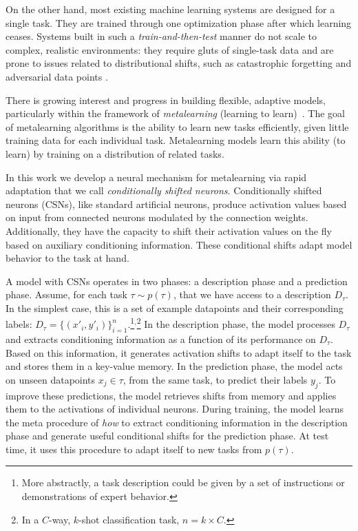 \documentclass{article}
\begin{document}
On the other hand, most existing machine learning systems are designed for a single task. They are trained through one optimization phase after which learning ceases. Systems built in such a \textit{train-and-then-test} manner do not scale to complex, realistic environments: they require gluts of single-task data and are prone to issues related to distributional shifts, such as catastrophic forgetting \cite{srivastava2013compete,goodfellow2013empirical,kirkpatrick2016overcoming} and adversarial data points \cite{szegedy2013intriguing}.

There is growing interest and progress in building flexible, adaptive models, particularly within the framework of \emph{metalearning} (learning to learn)~\citep{mitchell1993explanation,andrychowicz2016learning,vinyals2016matching,pmlr-v70-bachman17a}.
The goal of metalearning algorithms is the ability to learn new tasks efficiently, given little training data for each individual task.
Metalearning models learn this ability (to learn) by training on a distribution of related tasks.

In this work we develop a neural mechanism for metalearning via rapid adaptation that we call \emph{conditionally shifted neurons}.
Conditionally shifted neurons (CSNs), like standard artificial neurons, produce activation values based on input from connected neurons modulated by the connection weights. Additionally, they have the capacity to shift their activation values on the fly based on auxiliary conditioning information.
These conditional shifts adapt model behavior to the task at hand.

A model with CSNs operates in two phases: a description phase and a prediction phase.
Assume, for each task $\tau \sim p(\tau)$, that we have access to a description $D_\tau$. In the simplest case, this is a set of example datapoints and their corresponding labels: $D_\tau = \{ (x'_i,y'_i) \}^n_{i=1}$.\footnote{More abstractly, a task description could be given by a set of instructions or demonstrations of expert behavior.}${}^,$\footnote{In a $C$-way, $k$-shot classification task, $n = k \times C$.}
In the description phase, the model processes $D_\tau$ and extracts conditioning information as a function of its performance on $D_\tau$.
Based on this information, it generates activation shifts to adapt itself to the task and stores them in a key-value memory.
In the prediction phase, the model acts on unseen datapoints $x_j \in \tau$, from the same task, to predict their labels $y_j$.
To improve these predictions, the model retrieves shifts from memory and applies them to the activations of individual neurons.
During training, the model learns the meta procedure of \emph{how} to extract conditioning information in the description phase and generate useful conditional shifts for the prediction phase.
At test time, it uses this procedure to adapt itself to new tasks from $p(\tau)$.
\end{document}
